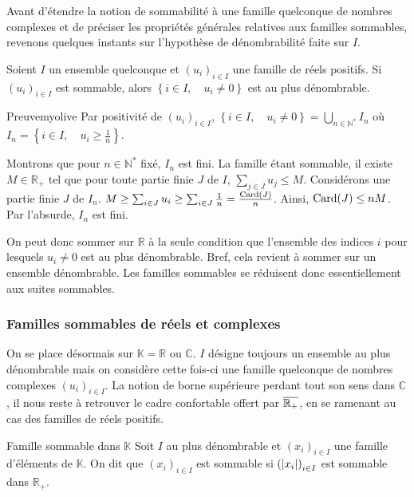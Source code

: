     Avant d’étendre la notion de sommabilité à une famille quelconque de nombres complexes et de préciser les propriétés générales relatives aux familles sommables, revenons quelques instants sur l’hypothèse de dénombrabilité faite sur $I$.

    \begin{prop}{}{}
        Soient $I$ un ensemble quelconque et $(u_i)_{i \in I}$ une famille de réels positifs. Si $(u_i)_{i \in I}$ est sommable, alors $\left\{i \in I, \quad u_i \neq 0\right\}$ est au plus dénombrable.
    \end{prop}

    \begin{demo}{Preuve}{myolive}
        Par positivité de $(u_i)_{i \in I}$, $\left\{i \in I, \quad u_i \neq 0\right\}= \bigcup_{n \in \mathbb{N}^*} I_n$ où $I_n = \left\{i \in I, \quad u_i \geq \frac{1}{n}\right\}$. 

        Montrons que pour $n \in \mathbb{N}^*$ fixé, $I_n$ est fini. La famille étant sommable, il existe $M \in \mathbb{R}_+$ tel que pour toute partie finie $J$ de $I$, $\sum_{j \in J} u_j \leq M$. Considérons une partie finie $J$ de $I_n$. $M \geq \sum_{i \in J} u_i \geq \sum_{i \in J} \frac{1}{n} = \frac{\operatorname{Card}(J)}{n}$. Ainsi, $\operatorname{Card}(J) \leq nM$. Par l’absurde, $I_n$ est fini.
    \end{demo}

    On peut donc sommer sur $\mathbb{R}$ à la seule condition que l’ensemble des indices $i$ pour lesquels $u_i \neq 0$ est au plus dénombrable. Bref, cela revient à sommer sur un ensemble dénombrable. Les familles sommables se réduisent donc essentiellement aux suites sommables.

    \subsubsection{Familles sommables de réels et complexes}

    On se place désormais sur $\mathbb{K} = \mathbb{R}$ ou $\mathbb{C}$. $I$ désigne toujours un ensemble au plus dénombrable mais on considère cette fois-ci une famille quelconque de nombres complexes $(u_i)_{i \in I}$. La notion de borne supérieure perdant tout son sens dans $\mathbb{C}$, il nous reste à retrouver le cadre confortable offert par $\overline{\mathbb{R}_+}$, en se ramenant au cas des familles de réels positifs.

    \begin{defi}{Famille sommable dans $\mathbb{K}$}{}
        Soit $I$ au plus dénombrable et $(x_i)_{i \in I}$ une famille d’éléments de $\mathbb{K}$. On dit que $(x_i)_{i \in I}$ est sommable si $\left(\left\lvert x_i\right\rvert\right)_{i \in I}$ est sommable dans $\mathbb{R}_+$. 
    \end{defi}

